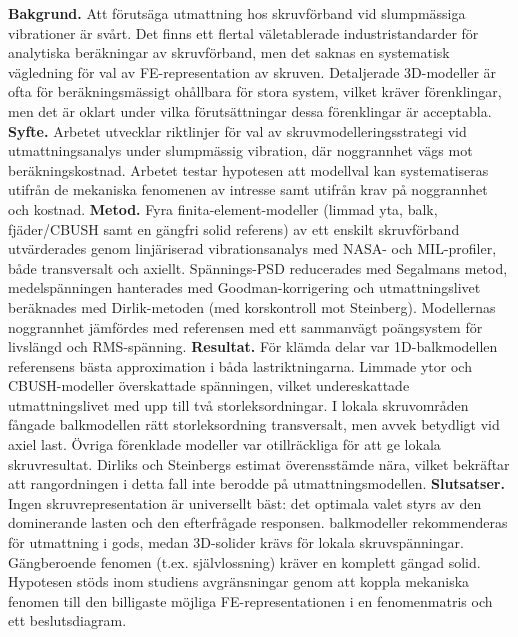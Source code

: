 \documentclass[a4paper,twoside]{bth}
\begin{document}
\noindent
\textbf{Bakgrund.}
Att förutsäga utmattning hos skruvförband vid slumpmässiga vibrationer är svårt. Det finns ett flertal väletablerade industristandarder för analytiska beräkningar av skruvförband, men det saknas en systematisk vägledning för val av FE-representation av skruven. Detaljerade 3D-modeller är ofta för beräkningsmässigt ohållbara för stora system, vilket kräver förenklingar, men det är oklart under vilka förutsättningar dessa förenklingar är acceptabla.
\newline
\textbf{Syfte.}
Arbetet utvecklar riktlinjer för val av skruvmodelleringsstrategi vid utmattningsanalys under slumpmässig vibration, där noggrannhet vägs mot beräkningskostnad. Arbetet testar hypotesen att modellval kan systematiseras utifrån de mekaniska fenomenen av intresse samt utifrån krav på noggrannhet och kostnad.
\newline
\textbf{Metod.}
Fyra finita-element-modeller (limmad yta, balk, fjäder/CBUSH samt en gängfri solid referens) av ett enskilt skruvförband utvärderades genom linjäriserad vibrationsanalys med NASA- och MIL-profiler, både transversalt och axiellt. Spännings-PSD reducerades med Segalmans metod, medelspänningen hanterades med Goodman-korrigering och utmattningslivet beräknades med Dirlik-metoden (med korskontroll mot Steinberg). Modellernas noggrannhet jämfördes med referensen med ett sammanvägt poängsystem för livslängd och RMS-spänning.
\newline
\textbf{Resultat.}
För klämda delar var 1D-balkmodellen referensens bästa approximation i båda lastriktningarna. Limmade ytor och CBUSH-modeller överskattade spänningen, vilket undereskattade utmattningslivet med upp till två storleksordningar. I lokala skruvområden fångade balkmodellen rätt storleksordning transversalt, men avvek betydligt vid axiel last. Övriga förenklade modeller var otillräckliga för att ge lokala skruvresultat. Dirliks och Steinbergs estimat överensstämde nära, vilket bekräftar att rangordningen i detta fall inte berodde på utmattningsmodellen.
\newline
\textbf{Slutsatser.}
Ingen skruvrepresentation är universellt bäst: det optimala valet styrs av den dominerande lasten och den efterfrågade responsen. balkmodeller rekommenderas för utmattning i gods, medan 3D-solider krävs för lokala skruvspänningar. Gängberoende fenomen (t.ex. självlossning) kräver en komplett gängad solid. Hypotesen stöds inom studiens avgränsningar genom att koppla mekaniska fenomen till den billigaste möjliga FE-representationen i en fenomenmatris och ett beslutsdiagram.
\end{document}
